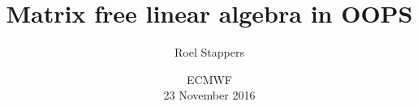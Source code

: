 \documentclass[9pt]{beamer}
\title[mfla]{Matrix free linear algebra in OOPS}
\author[Roel Stappers]{Roel Stappers} %
\date[23 November 2016]{ECMWF \\  23 November 2016}
\institute[Met Norway]{\inst{1} Norwegian Meteorological Institute\\ \url{roels@met.no} }
\begin{document}
\begin{frame} %
  \maketitle
\end{frame}

\begin{frame} %
  \tableofcontents
\end{frame}



\end{document}
